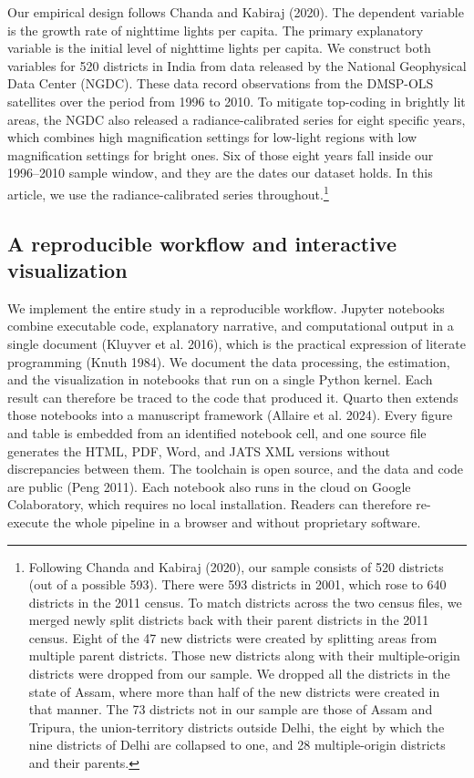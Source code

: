\documentclass[
  letterpaper,
  DIV=11,
  numbers=noendperiod]{scrartcl}
\begin{document}
Our empirical design follows Chanda and Kabiraj (2020). The dependent
variable is the growth rate of nighttime lights per capita. The primary
explanatory variable is the initial level of nighttime lights per
capita. We construct both variables for 520 districts in India from data
released by the National Geophysical Data Center (NGDC). These data
record observations from the DMSP-OLS satellites over the period from
1996 to 2010. To mitigate top-coding in brightly lit areas, the NGDC
also released a radiance-calibrated series for eight specific years,
which combines high magnification settings for low-light regions with
low magnification settings for bright ones. Six of those eight years
fall inside our 1996--2010 sample window, and they are the dates our
dataset holds. In this article, we use the radiance-calibrated series
throughout.\footnote{Following Chanda and Kabiraj (2020), our sample
  consists of 520 districts (out of a possible 593). There were 593
  districts in 2001, which rose to 640 districts in the 2011 census. To
  match districts across the two census files, we merged newly split
  districts back with their parent districts in the 2011 census. Eight
  of the 47 new districts were created by splitting areas from multiple
  parent districts. Those new districts along with their multiple-origin
  districts were dropped from our sample. We dropped all the districts
  in the state of Assam, where more than half of the new districts were
  created in that manner. The 73 districts not in our sample are those
  of Assam and Tripura, the union-territory districts outside Delhi, the
  eight by which the nine districts of Delhi are collapsed to one, and
  28 multiple-origin districts and their parents.}

\subsection{A reproducible workflow and interactive
visualization}\label{a-reproducible-workflow-and-interactive-visualization}

We implement the entire study in a reproducible workflow. Jupyter
notebooks combine executable code, explanatory narrative, and
computational output in a single document (Kluyver et al. 2016), which
is the practical expression of literate programming (Knuth 1984). We
document the data processing, the estimation, and the visualization in
notebooks that run on a single Python kernel. Each result can therefore
be traced to the code that produced it. Quarto then extends those
notebooks into a manuscript framework (Allaire et al. 2024). Every
figure and table is embedded from an identified notebook cell, and one
source file generates the HTML, PDF, Word, and JATS XML versions without
discrepancies between them. The toolchain is open source, and the data
and code are public (Peng 2011). Each notebook also runs in the cloud on
Google Colaboratory, which requires no local installation. Readers can
therefore re-execute the whole pipeline in a browser and without
proprietary software.
\end{document}
